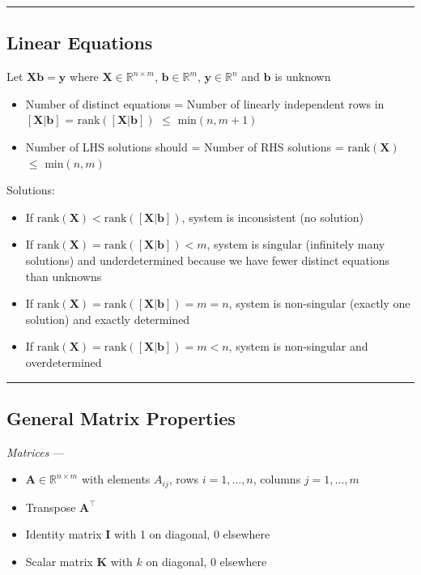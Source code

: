 {\color{black}\hrule height 0.001mm}

\subsection*{Linear Equations}
Let $\boldsymbol{X}\boldsymbol{b} = \boldsymbol{y}$ where $\boldsymbol{X} \in \mathbb{R}^{n \times m}$, $\boldsymbol{b} \in \mathbb{R}^{m}$, $\boldsymbol{y} \in \mathbb{R}^{n}$ and $\boldsymbol{b}$ is unknown
\begin{itemize}
    \item Number of distinct equations = Number of linearly independent rows in $[\boldsymbol{X} | \boldsymbol{b}]$ = $\textrm{rank}([\boldsymbol{X} | \boldsymbol{b}])$ $\leq$ $\textrm{min}(n,m+1)$
    \item Number of LHS solutions should = Number of RHS solutions = $\textrm{rank}(\boldsymbol{X})$ $\leq$ $\textrm{min}(n,m)$
\end{itemize}
Solutions:
\begin{itemize}
    \item If $\textrm{rank}(\boldsymbol{X}) < \textrm{rank}([\boldsymbol{X} | \boldsymbol{b}])$, system is inconsistent (no solution)
    \item If $\textrm{rank}(\boldsymbol{X}) = \textrm{rank}([\boldsymbol{X} | \boldsymbol{b}]) < m$, system is singular  (infinitely many solutions) and underdetermined because we have fewer distinct equations than unknowns
    \item If $\textrm{rank}(\boldsymbol{X}) = \textrm{rank}([\boldsymbol{X} | \boldsymbol{b}]) = m = n$, system is non-singular (exactly one solution) and exactly determined 
    \item If $\textrm{rank}(\boldsymbol{X}) = \textrm{rank}([\boldsymbol{X} | \boldsymbol{b}]) = m < n$, system is non-singular and overdetermined 
\end{itemize}

{\color{black}\hrule height 0.001mm}

\subsection*{General Matrix Properties}
\emph{Matrices} ---
\begin{itemize}
    \item $\boldsymbol{A} \in \mathbb{R}^{n \times m}$ with elements $A_{ij}$, rows $i = 1,...,n$, columns $j = 1,...,m$
    \item Transpose $\boldsymbol{A^\intercal}$
    \item Identity matrix $\boldsymbol{I}$ with 1 on diagonal, 0 elsewhere
    \item Scalar matrix $\boldsymbol{K}$ with $k$ on diagonal, 0 elsewhere
\end{itemize}


